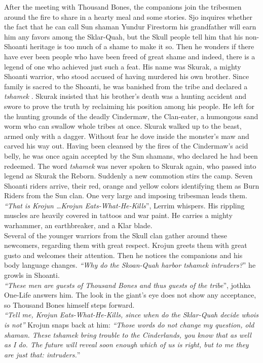 After the meeting with Thousand Bones, the companions join the tribesmen around the fire to share in a hearty meal and some stories. Sjo inquires whether the fact that he can call Sun shaman Yundur Firestorm his grandfather will earn him any favors among the Sklar-Quah, but the Skull people tell him that his non-Shoanti heritage is too much of a shame to make it so. Then he wonders if there have ever been people who have been freed of great shame and indeed, there is a legend of one who achieved just such a feat. His name was Skurak, a mighty Shoanti warrior, who stood accused of having murdered his own brother. Since family is sacred to the Shoanti, he was banished from the tribe and declared a {\itshape tshamek} . Skurak insisted that his brother's death was a hunting accident and swore to prove the truth by reclaiming his position among his people. He left for the hunting grounds of the deadly Cindermaw, the Clan-eater, a humongous sand worm who can swallow whole tribes at once. Skurak walked up to the beast, armed only with a dagger. Without fear he dove inside the monster's maw and carved his way out. Having been cleansed by the fires of the Cindermaw's acid belly, he was once again accepted by the Sun shamans, who declared he had been redeemed. The word  {\itshape tshamek} was never spoken to Skurak again, who passed into legend as Skurak the Reborn. Suddenly a new commotion stirs the camp. Seven Shoanti riders arrive, their red, orange and yellow colors identifying them as Burn Riders from the Sun clan. One very large and imposing tribesman leads them. {\itshape``That is Krojun \ldots Krojun Eats-What-He-Kills}'', Lerrim whispers. His rippling muscles are heavily covered in tattoos and war paint. He carries a mighty warhammer, an earthbreaker, and a Klar blade.\\

Several of the younger warriors from the Skull clan gather around these newcomers, regarding them with great respect. Krojun greets them with great gusto and welcomes their attention. Then he notices the companions and his body language changes. {\itshape``Why do the Skoan-Quah harbor tshamek intruders?}'' he growls in Shoanti.\\

{\itshape``These men are guests of Thousand Bones and thus guests of the tribe}'', jothka One-Life answers him. The look in the giant's eye does not show any acceptance, so Thousand Bones himself steps forward.\\

{\itshape``Tell me, Krojun Eats-What-He-Kills, since when do the Sklar-Quah decide whois is not''} Krojun snaps back at him: {\itshape``Those words do not change my question, old shaman. These tshamek bring trouble to the Cinderlands, you know that as well as I do. The future will reveal soon enough which of us is right, but to me they are just that: intruders.}''\\

